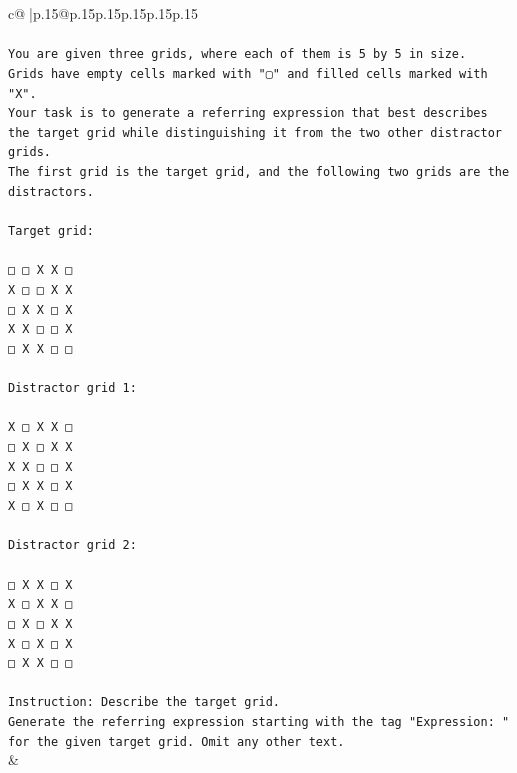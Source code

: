 \documentclass{article}
\begin{document}
{\begin{supertabular}{c@{$\;$}|p{.15\linewidth}@{}p{.15\linewidth}p{.15\linewidth}p{.15\linewidth}p{.15\linewidth}p{.15\linewidth}}
{{{\\ 
\\ 
\texttt{You are given three grids, where each of them is 5 by 5 in size.} \\
\texttt{Grids have empty cells marked with "▢" and filled cells marked with "X".} \\
\texttt{Your task is to generate a referring expression that best describes the target grid while distinguishing it from the two other distractor grids.} \\
\texttt{The first grid is the target grid, and the following two grids are the distractors.} \\
\\ 
\texttt{Target grid:} \\
\\ 
\texttt{□ □ X X □} \\
\texttt{X □ □ X X} \\
\texttt{□ X X □ X} \\
\texttt{X X □ □ X} \\
\texttt{□ X X □ □} \\
\\ 
\texttt{Distractor grid 1:} \\
\\ 
\texttt{X □ X X □} \\
\texttt{□ X □ X X} \\
\texttt{X X □ □ X} \\
\texttt{□ X X □ X} \\
\texttt{X □ X □ □} \\
\\ 
\texttt{Distractor grid 2:} \\
\\ 
\texttt{□ X X □ X} \\
\texttt{X □ X X □} \\
\texttt{□ X □ X X} \\
\texttt{X □ X □ X} \\
\texttt{□ X X □ □} \\
\\ 
\texttt{Instruction: Describe the target grid.} \\
\texttt{Generate the referring expression starting with the tag "Expression: " for the given target grid. Omit any other text.} \\
            }
        }
    }
    & \\ \\


\end{supertabular}}
\end{document}
